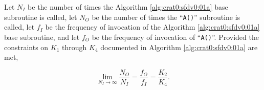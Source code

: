 \begin{vworklemmastatement}
\label{lem:crat0:sfdv0:sprc0:02}
Let $N_I$ be the number of times the Algorithm
\ref{alg:crat0:sfdv0:01a} base subroutine
is called, let $N_O$ be the number of times the 
``\texttt{A()}'' subroutine is called, let
$f_I$ be the frequency of invocation of the 
Algorithm \ref{alg:crat0:sfdv0:01a} base subroutine, and let 
$f_O$ be the frequency of invocation of 
``\texttt{A()}''.  Provided the constraints
on $K_1$ through $K_4$ documented in
Algorithm \ref{alg:crat0:sfdv0:01a} are met,

\begin{equation}
\label{eq:lem:crat0:sfdv0:sprc0:02:01}
\lim_{N_I\rightarrow\infty}\frac{N_O}{N_I}
=
\frac{f_O}{f_I}
=
\frac{K_2}{K_4} . 
\end{equation} 
\end{vworklemmastatement}
